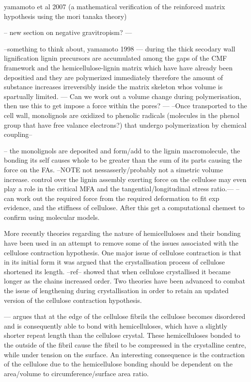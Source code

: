 \documentclass{article}
\begin{document}
yamamoto et al 2007 (a mathematical verification of the reinforced matrix
hypothesis using the mori tanaka theory)

-- new section on negative gravitropism? ---


--something to think about, yamamoto 1998 ---
during the thick secodary wall lignification lignin precursors are accumulated
among the gaps of the CMF framework and the hemicellulose-lignin matrix which
have have already been depositied and they are polymerized immediately therefore
the amount of substance increases irreversibly inside the matrix skeleton whos
volume is spartually limited. --- Can we work out a volume change during
polymerisation, then use this to get impose a force within the pores? ---
--Once transported to the cell wall, monolignols are oxidized to phenolic
radicals (molecules in the phenol group that have free valance electrons?) that
undergo polymerization by chemical coupling--

-- the monolignols are deposited and form/add to the lignin macromolecule,
the bonding its self causes whole to be greater than the sum of its parts
causing the force on the FAs.
--NOTE not nessasserly/probably not a simetric volume increase. control over the
lignin assembly exerting force on the cellulose may even play a role in the
critical MFA and the tangential/longitudinal stress ratio.---
--can work out the required force from the required deformation to fit exp
evidence, and the stiffness of cellulose. After this get a computational chemest
to confirm using molecular models.

More recently theories regarding the nature of hemicelluloses and their bonding
have been used in an attempt to remove some of the issues associated with the
cellulose contraction hypothesis. One major issue of cellulose contraction is
that in its initial form it was argued that the crystallisation process of cellulose
shortened its length. --ref-- showed that when cellulose crystallised it became
longer as the chains increased order. Two theories have been advanced to combat
the issue of lengthening during crystallisation in order to retain an updated
version of the cellulose contraction hypothesis.

--- argues that at the edge of the cellulose fibrils the cellulose becomes
disordered and is consequently able to bond with hemicelluloses, which have a
slightly shorter repeat length than the cellulose crystal. These hemicelluloses
bonded to the outside of the fibril cause the fibril to be compressed in the
crystalline centre, while under tension on the surface. An interesting consequence
is the contraction of the cellulose due to the hemicellulose bonding should be
dependent on the area/volume to circumference/surface area ratio.
\end{document}
